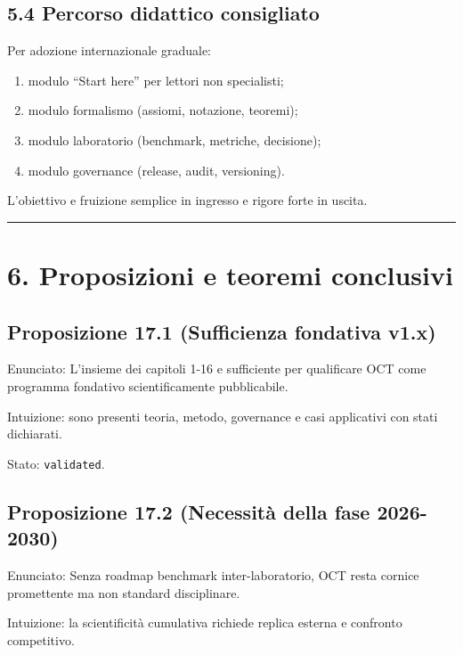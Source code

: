 \subsection{5.4 Percorso didattico consigliato}

Per adozione internazionale graduale:

\begin{enumerate}
\def\labelenumi{\arabic{enumi}.}
\tightlist
\item
  modulo ``Start here'' per lettori non specialisti;
\item
  modulo formalismo (assiomi, notazione, teoremi);
\item
  modulo laboratorio (benchmark, metriche, decisione);
\item
  modulo governance (release, audit, versioning).
\end{enumerate}

L'obiettivo e fruizione semplice in ingresso e rigore forte in uscita.

\begin{center}\rule{0.5\linewidth}{0.5pt}\end{center}

\section{6. Proposizioni e teoremi conclusivi}

\subsection{Proposizione 17.1 (Sufficienza fondativa v1.x)}

Enunciato:
L'insieme dei capitoli 1-16 e sufficiente per qualificare OCT come programma fondativo scientificamente pubblicabile.

Intuizione:
sono presenti teoria, metodo, governance e casi applicativi con stati dichiarati.

Stato: \texttt{validated}.

\subsection{Proposizione 17.2 (Necessità della fase 2026-2030)}

Enunciato:
Senza roadmap benchmark inter-laboratorio, OCT resta cornice promettente ma non standard disciplinare.

Intuizione:
la scientificità cumulativa richiede replica esterna e confronto competitivo.

